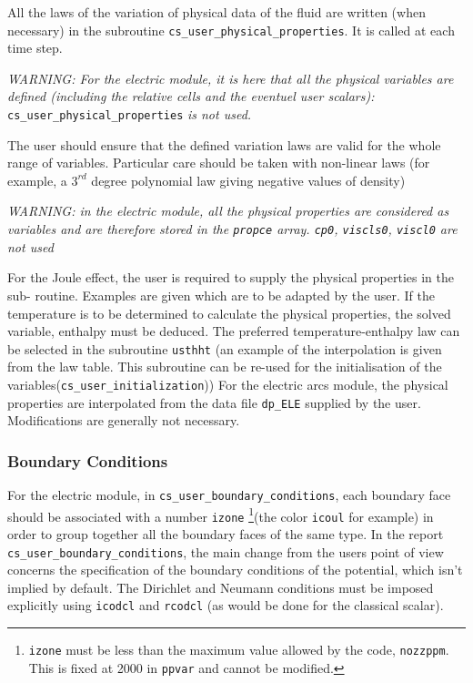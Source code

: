 {{All the laws of the variation of physical data of the fluid are written (when necessary)
in the subroutine \texttt{cs\_user\_physical\_properties}. It is called at each time step.

{\em WARNING: For the electric module, it is here that all the physical variables are defined
 (including the relative cells and the eventuel user scalars):} \texttt{cs\_user\_physical\_properties} {\em {is not used.}}

The user should ensure that the defined variation laws are valid for the whole range of
variables. Particular care should be taken with non-linear laws (for example, a
 $3^{rd}$ degree polynomial law giving negative values of density)

{\em WARNING: in the electric module, all the physical properties are considered as variables
 and are therefore stored in the \texttt{propce} array. \texttt{cp0}, \texttt{viscls0}, \texttt{viscl0}
 are not used}

For the Joule effect, the user is required to supply the physical properties in the sub-
routine. Examples are given which are to be adapted by the user. If the temperature is
to be determined to calculate the physical properties, the solved variable, enthalpy must
 be deduced. The preferred temperature-enthalpy law can be selected in the subroutine
 \texttt{usthht} (an example of the interpolation is given from the law table. This
subroutine can be re-used for the initialisation of the variables(\texttt{cs\_user\_initialization}))
 For the electric arcs module, the physical properties are interpolated from the data file
 \texttt{dp\_ELE} supplied by the user. Modifications are generally not necessary.

\subsubsection{Boundary Conditions}

For the electric module, in \texttt{cs\_user\_boundary\_conditions}, each
boundary face should be associated with a number
 \texttt{izone} \footnote{\texttt{izone} must be less than the maximum
 value allowed by the code, \texttt{nozzppm}. This is fixed at 2000 in \texttt
{ppvar} and cannot be modified.}(the color \texttt{icoul} for example) in
 order to group together all the boundary faces of the same type. In the report
 \texttt{cs\_user\_boundary\_conditions}, the main change from the users point of view concerns the
 specification of the boundary conditions of the potential, which isn't
 implied by default. The Dirichlet and Neumann conditions must be imposed
 explicitly using \texttt{icodcl} and \texttt{rcodcl} (as would be done for
 the classical scalar).

}}
